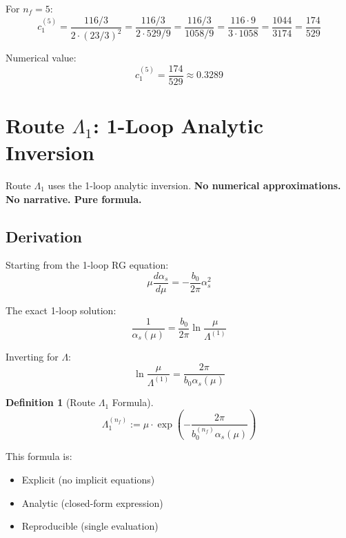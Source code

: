 \documentclass[11pt,a4paper]{article}
\theoremstyle{definition}
\newtheorem{definition}{Definition}[section]
\begin{document}
For $n_f = 5$:
\begin{equation}
\label{eq:c1-5}
c_1^{(5)} = \frac{116/3}{2 \cdot (23/3)^2} = \frac{116/3}{2 \cdot 529/9}
  = \frac{116/3}{1058/9} = \frac{116 \cdot 9}{3 \cdot 1058} = \frac{1044}{3174}
  = \frac{174}{529}
\end{equation}

Numerical value:
\begin{equation}
\label{eq:c1-5-num}
c_1^{(5)} = \frac{174}{529} \approx 0.3289
\end{equation}

\section{Route $\Lambda_1$: 1-Loop Analytic Inversion}
\label{sec:route-lambda1}

\begin{lambdabox}
Route $\Lambda_1$ uses the 1-loop analytic inversion.
\textbf{No numerical approximations. No narrative. Pure formula.}
\end{lambdabox}

\subsection{Derivation}
\label{subsec:lambda1-derivation}

Starting from the 1-loop RG equation:
\begin{equation}
\label{eq:rge-1loop}
\mu\frac{d\alpha_s}{d\mu} = -\frac{b_0}{2\pi}\alpha_s^2
\end{equation}

The exact 1-loop solution:
\begin{equation}
\label{eq:1loop-solution}
\frac{1}{\alpha_s(\mu)} = \frac{b_0}{2\pi}\ln\frac{\mu}{\Lambda^{(1)}}
\end{equation}

Inverting for $\Lambda$:
\begin{equation}
\label{eq:lambda1-inversion}
\ln\frac{\mu}{\Lambda^{(1)}} = \frac{2\pi}{b_0 \alpha_s(\mu)}
\end{equation}

\begin{definition}[Route $\Lambda_1$ Formula]
\label{def:route-lambda1}
\begin{equation}
\label{eq:lambda1-formula}
\boxed{\Lambda_1^{(n_f)} := \mu \cdot \exp\left(-\frac{2\pi}{b_0^{(n_f)} \alpha_s(\mu)}\right)}
\end{equation}

This formula is:
\begin{itemize}
  \item Explicit (no implicit equations)
  \item Analytic (closed-form expression)
  \item Reproducible (single evaluation)
\end{itemize}
\end{definition}
\end{document}
